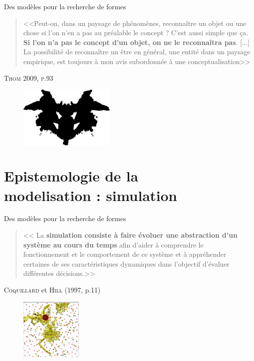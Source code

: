\documentclass[newPxFont]{beamer}
\begin{document}
\begin{frame}[c]{Des modèles pour la recherche de formes}
  \vspace{-1em}
  \begin{quote}
    <<Peut-on, dans un paysage de phénomènes, reconnaître un objet ou une chose si l'on n'en a pas au préalable le concept ? C'est aussi simple que ça. \textbf{Si l'on n'a pas le concept d'un objet, on ne le reconnaîtra pas}. [...] La possibilité de reconnaître un être en général, une entité dans un paysage empirique, est toujours à mon avis subordonnée à une conceptualisation>>
  \end{quote}
  \hspace*{\fill}\textsc{Thom 2009, p.93}
  \vspace{-0.5em}
  \begin{figure}
   \includegraphics[height=3cm]{img/a_rorschach.png}
  \end{figure}
\end{frame}

\section{Epistemologie de la\\ modelisation : simulation}

\begin{frame}[c]{Des modèles pour la recherche de formes}
  \vspace{-1em}
  \begin{quote}
    << La \textbf{simulation consiste à faire évoluer une abstraction d’un système au cours
    du temps} afin d’aider à comprendre le fonctionnement et le comportement de
    ce système et à appréhender certaines de ses caractéristiques dynamiques dans
    l’objectif d’évaluer différentes décisions.>>
  \end{quote}
  \hspace*{\fill}\textsc{Coquillard} et \textsc{Hill} (1997, p.11)
  \vspace{-0.5em}
  \begin{figure}
   \includegraphics[height=3cm]{img/a_view_zoom_dist2.png}
  \end{figure}
\end{frame}
\end{document}
